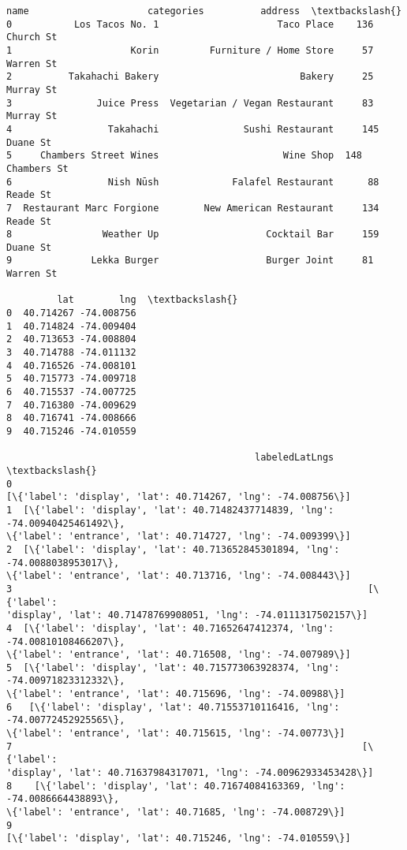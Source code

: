 \documentclass[11pt]{article}
\makeatletter
\newcommand{\boxspacing}{\kern\kvtcb@left@rule\kern\kvtcb@boxsep}
\newcommand{\prompt}[4]{
        \ttfamily\llap{{\color{#2}[#3]:\hspace{3pt}#4}}\vspace{-\baselineskip}
    }
\makeatother
\begin{document}
            \begin{tcolorbox}[breakable, size=fbox, boxrule=.5pt, pad at break*=1mm, opacityfill=0]
\prompt{Out}{outcolor}{47}{\boxspacing}
\begin{Verbatim}[commandchars=\\\{\}]
                       name                     categories          address  \textbackslash{}
0           Los Tacos No. 1                     Taco Place    136 Church St
1                     Korin         Furniture / Home Store     57 Warren St
2          Takahachi Bakery                         Bakery     25 Murray St
3               Juice Press  Vegetarian / Vegan Restaurant     83 Murray St
4                 Takahachi               Sushi Restaurant     145 Duane St
5     Chambers Street Wines                      Wine Shop  148 Chambers St
6                 Nish Nūsh             Falafel Restaurant      88 Reade St
7  Restaurant Marc Forgione        New American Restaurant     134 Reade St
8                Weather Up                   Cocktail Bar     159 Duane St
9              Lekka Burger                   Burger Joint     81 Warren St

         lat        lng  \textbackslash{}
0  40.714267 -74.008756
1  40.714824 -74.009404
2  40.713653 -74.008804
3  40.714788 -74.011132
4  40.716526 -74.008101
5  40.715773 -74.009718
6  40.715537 -74.007725
7  40.716380 -74.009629
8  40.716741 -74.008666
9  40.715246 -74.010559

                                            labeledLatLngs  \textbackslash{}
0
[\{'label': 'display', 'lat': 40.714267, 'lng': -74.008756\}]
1  [\{'label': 'display', 'lat': 40.71482437714839, 'lng': -74.00940425461492\},
\{'label': 'entrance', 'lat': 40.714727, 'lng': -74.009399\}]
2  [\{'label': 'display', 'lat': 40.713652845301894, 'lng': -74.0088038953017\},
\{'label': 'entrance', 'lat': 40.713716, 'lng': -74.008443\}]
3                                                               [\{'label':
'display', 'lat': 40.71478769908051, 'lng': -74.0111317502157\}]
4  [\{'label': 'display', 'lat': 40.71652647412374, 'lng': -74.00810108466207\},
\{'label': 'entrance', 'lat': 40.716508, 'lng': -74.007989\}]
5  [\{'label': 'display', 'lat': 40.715773063928374, 'lng': -74.00971823312332\},
\{'label': 'entrance', 'lat': 40.715696, 'lng': -74.00988\}]
6   [\{'label': 'display', 'lat': 40.71553710116416, 'lng': -74.00772452925565\},
\{'label': 'entrance', 'lat': 40.715615, 'lng': -74.00773\}]
7                                                              [\{'label':
'display', 'lat': 40.71637984317071, 'lng': -74.00962933453428\}]
8    [\{'label': 'display', 'lat': 40.71674084163369, 'lng': -74.0086664438893\},
\{'label': 'entrance', 'lat': 40.71685, 'lng': -74.008729\}]
9
[\{'label': 'display', 'lat': 40.715246, 'lng': -74.010559\}]


\end{Verbatim}
\end{tcolorbox}
\end{document}
